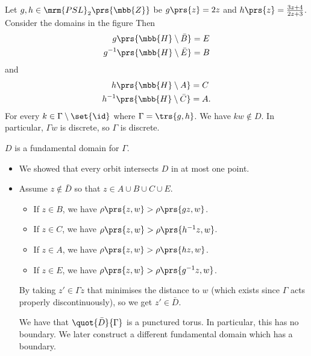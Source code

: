 \documentclass[10pt, twoside]{book}
\begin{document}
\begin{example}
Let $g,h \in \mrm{PSL}_2\prs{\mbb{Z}}$ be $g\prs{z} = 2z$ and $h\prs{z} = \frac{3z + 4}{2z + 3}$.
Consider the domains in the figure %
Then
\begin{align*}
g\prs{\mbb{H} \setminus \bar{B}} &= E \\
g^{-1}\prs{\mbb{H} \setminus \bar{E}} &= B
\end{align*}
and
\begin{align*}
h\prs{\mbb{H} \setminus A} &= C \\
h^{-1}\prs{\mbb{H} \setminus \bar{C}} &= A \text{.}
\end{align*}
For every $k \in \Gamma \setminus \set{\id}$ where $\Gamma = \trs{g,h}$. We have $kw \notin D$.
In particular, $\Gamma w$ is discrete, so $\Gamma$ is discrete.

$D$ is a fundamental domain for $\Gamma$.
\begin{itemize}
\item We showed that every orbit intersects $D$ in at most one point.
\item Assume $z \notin \bar{D}$ so that $z \in A \cup B \cup C \cup E$.
\begin{itemize}
\item If $z \in B$, we have $\rho\prs{z,w} > \rho\prs{gz, w}$.
\item If $z \in C$, we have $\rho\prs{z,w} > \rho\prs{h^{-1} z, w}$.
\item If $z \in A$, we have $\rho\prs{z,w} > \rho\prs{hz, w}$.
\item If $z \in E$, we have $\rho\prs{z,w} > \rho\prs{g^{-1}z, w}$.
\end{itemize}
By taking $z' \in \Gamma z$ that minimises the distance to $w$ (which exists since $\Gamma$ acts properly discontinuously), so we get $z' \in \bar{D}$.

We have that $\quot{\bar{D}}{\Gamma}$ is a punctured torus. In particular, this has no boundary. We later construct a different fundamental domain which has a boundary.
\end{itemize}
\end{example}
\end{document}
